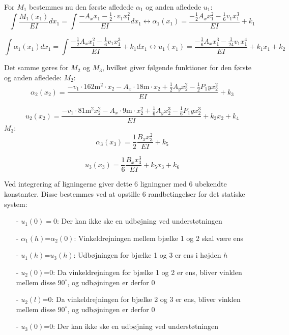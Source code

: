 For $M_1$ bestemmes nu den første afledede $\alpha_1$ og anden afledede $u_1$: %
\begin{equation}
	\int \frac{M_1(x_1)}{EI} dx_1 = \int \frac{-A_x x_1 - \frac{1}{2}\cdot v_1 x_1^2}{EI} dx_1
	\leftrightarrow \alpha_1(x_1) = \frac{-\frac{1}{2} A_x x_1^2 - \frac{1}{6}  v_1  x_1^3 }{EI} + k_1
\end{equation}

\begin{equation}
	\int \alpha_1(x_1) dx_1 = \int \frac{-\frac{1}{2} A_x x_1^2 - \frac{1}{6} v_1 x_1^3}{EI} + k_1 dx_1 \leftrightarrow
	u_1(x_1) = \frac{-\frac{1}{6} A_x x_1^3 - \frac{1}{24} v_1x_1^4 }{EI} + k_1 x_1 + k_2
\end{equation}

Det samme gøres for $M_2$ og $M_3$, hvilket giver følgende funktioner for den første og anden afledede: 
\newline
\newline
$M_2$:
\begin{equation}
	\alpha_2(x_2) = \frac{-v_1 \cdot 162 \text{m}^2 \cdot x_2 - A_x \cdot 18 \text{m} \cdot x_2 + \frac{1}{2} A_y x_2^2 - \frac{1}{2}P_1y x_2^2}{EI} + k_3
\end{equation}
	
\begin{equation}
	u_2(x_2) = \frac{-v_1 \cdot 81 \text{m}^2 x_2^2 - A_x \cdot 9 \text{m} \cdot x_2^2 + \frac{1}{6} A_y x_2^3 - \frac{1}{6} P_1y x_2^3}{EI} + k_3 x_2 + k_4
\end{equation} 
\newline
\newline
$M_3$:
\begin{equation}
\alpha_3(x_3) = \frac{1}{2}\frac{B_x x_3^2}{EI} + k_5
\end{equation}

\begin{equation}
u_3(x_3) = \frac{1}{6} \frac{B_x x_3^3}{EI} + k_5 x_3 + k_6
\end{equation}

Ved integrering af ligningerne giver dette 6 ligningner med 6 ubekendte konstanter. Disse bestemmes ved at opstille 6 randbetingelser for det statiske system: 

\begin{itemize}
	\item[-] $u_1(0)=0$: Der kan ikke ske en udbøjning ved understøtningen
	\item[-] $\alpha_1(h)$=$\alpha_2(0)$: Vinkeldrejningen mellem bjælke 1 og 2 skal være ens
	\item[-] $u_1(h)$=$u_3(h)$: Udbøjningen for bjælke 1 og 3 er ens i højden $h$
	\item[-] $u_2(0)$=0: Da vinkeldrejningen for bjælke 1 og 2 er ens, bliver vinklen mellem disse $90^{\circ}$, og udbøjningen er derfor 0
	\item[-] $u_2(l)$=0: Da vinkeldrejningen for bjælke 2 og 3 er ens, bliver vinklen mellem disse $90^{\circ}$, og udbøjningen er derfor 0
	\item[-] $u_3(0)$=0: Der kan ikke ske en udbøjning ved understøtningen
\end{itemize}

